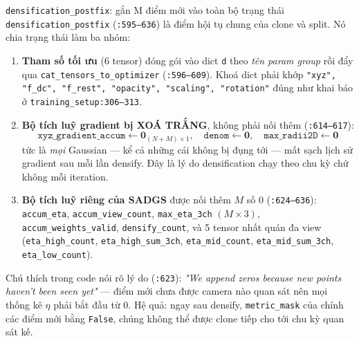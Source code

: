\begin{frame}{\texttt{densification\_postfix}: gắn M điểm mới vào toàn bộ trạng thái}
\footnotesize
\texttt{densification\_postfix} (\texttt{:595--636}) là điểm hội tụ chung của clone và split. Nó chia trạng thái làm ba nhóm:
\begin{enumerate}
\item \textbf{Tham số tối ưu} (6 tensor) đóng gói vào dict \texttt{d} theo \emph{tên param group} rồi đẩy qua \texttt{cat\_tensors\_to\_optimizer} (\texttt{:596--609}). Khoá dict phải khớp \texttt{"xyz", "f\_dc", "f\_rest", "opacity", "scaling", "rotation"} đúng như khai báo ở \texttt{training\_setup:306--313}.
\item \textbf{Bộ tích luỹ gradient bị XOÁ TRẮNG}, không phải nối thêm (\texttt{:614--617}):
\[
\texttt{xyz\_gradient\_accum}\leftarrow \mathbf{0}_{(N+M)\times1},\quad
\texttt{denom}\leftarrow \mathbf{0},\quad
\texttt{max\_radii2D}\leftarrow \mathbf{0}
\]
tức là \emph{mọi} Gaussian — kể cả những cái không bị đụng tới — mất sạch lịch sử gradient sau mỗi lần densify. Đây là lý do densification chạy theo chu kỳ chứ không mỗi iteration.
\item \textbf{Bộ tích luỹ riêng của SADGS} được nối thêm $M$ số 0 (\texttt{:624--636}): \texttt{accum\_eta}, \texttt{accum\_view\_count}, \texttt{max\_eta\_3ch} $(M\times3)$, \texttt{accum\_weights\_valid}, \texttt{densify\_count}, và 5 tensor nhất quán đa view (\texttt{eta\_high\_count}, \texttt{eta\_high\_sum\_3ch}, \texttt{eta\_mid\_count}, \texttt{eta\_mid\_sum\_3ch}, \texttt{eta\_low\_count}).
\end{enumerate}
Chú thích trong code nói rõ lý do (\texttt{:623}): \emph{"We append zeros because new points haven't been seen yet"} — điểm mới chưa được camera nào quan sát nên mọi thống kê $\eta$ phải bắt đầu từ 0. Hệ quả: ngay sau densify, \texttt{metric\_mask} của chính các điểm mới bằng \texttt{False}, chúng không thể được clone tiếp cho tới chu kỳ quan sát kế.
\end{frame}


